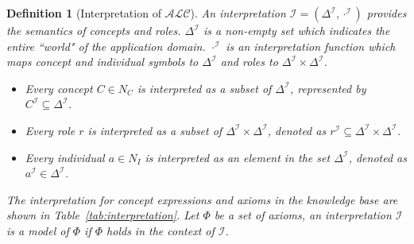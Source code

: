 \documentclass{article}
\newtheorem{mydef}{Definition}
\begin{document}
\begin{mydef}[Interpretation of $\mathcal{ALC}$]
An interpretation $\mathcal{I}=(\Delta^\mathcal{I},\cdot^\mathcal{I})$ provides the semantics of concepts and roles. $\Delta^\mathcal{I}$ is a non-empty set which indicates the entire
``world" of the application domain. $\cdot^\mathcal{I}$ is an interpretation function which maps concept and individual symbols to $\Delta^\mathcal{I}$ and roles to $\Delta^\mathcal{I} \times \Delta^\mathcal{I}$.
\begin{itemize}
 \item Every concept $C\in N_C$ is interpreted as a subset of $\Delta^\mathcal{I}$, represented by $C^\mathcal{I}\subseteq \Delta^\mathcal{I}$.
 \item Every  role $r$ is interpreted as a subset of $\Delta^\mathcal{I}\times\Delta^\mathcal{I}$, denoted as $r^\mathcal{I}\subseteq \Delta^\mathcal{I}\times\Delta^\mathcal{I}$.
 \item Every individual $a \in N_I$ is interpreted as an element in the set $\Delta^\mathcal{I}$, denoted as $a^\mathcal{I} \in \Delta^\mathcal{I}$.
\end{itemize}
The interpretation for concept expressions and axioms in the knowledge base are shown in Table~\ref{tab:interpretation}.
Let $\varPhi$ be a set of axioms, an interpretation $\mathcal{I}$ is a \textit{model} of $\varPhi$ if $\varPhi$ holds in the context of $\mathcal{I}$.
\end{mydef}
\end{document}

